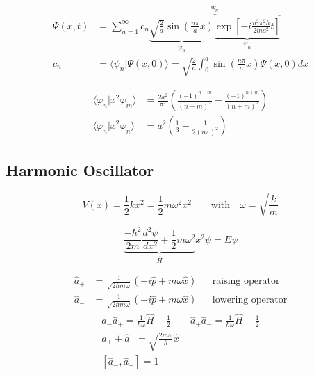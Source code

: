 \noindent\begin{align*}
    \Psi(x,t) & =\sum_{n=1}^{\infty}c_{n} \overbrace{\underbrace{\sqrt{\frac{2}{a}}\sin\left(\frac{n\pi}{a}x\right)}_{\psi_n} \underbrace{\exp\left[-i\frac{n^{2}\pi^{2}\hbar}{2ma^{2}}t\right]}_{\varphi_n}}^{\Psi_n} \\
    c_n       & =\langle \psi_n|\Psi(x,0)\rangle = \sqrt{\frac{2}{a}}\int_0^a\sin\left(\frac{n\pi}{a}x\right)\Psi(x,0)dx
\end{align*}

\noindent\begin{align*}
    \langle \varphi_n|x^2\varphi_m\rangle & = \frac{2a^2}{\pi^2}\left(\frac{{(-1)}^{n-m}}{{(n-m)}^2}-\frac{{(-1)}^{n+m}}{{(n+m)}^2}\right) \\
    \langle \varphi_n|x^2\varphi_n\rangle & = a^2\left(\frac{1}{3} -\frac{1}{2{(n\pi)}^2}\right)
\end{align*}

\subsection{Harmonic Oscillator}
\begin{equation*}
    V(x) = \frac{1}{2}k x^2 = \frac{1}{2}m \omega^2 x^2 \qquad \text{with} \quad \omega = \sqrt{\frac{k}{m}}
\end{equation*}

\noindent\begin{equation*}
    \underbrace{\frac{-\hbar^2}{2m}\frac{d^2\psi}{dx^2} + \frac{1}{2}m \omega^2}_{\widehat{H}} x^2 \psi  = E\psi
\end{equation*}

\begin{align*}
    \widehat{a}_{+} & = \frac{1}{\sqrt{2\hbar m \omega}}\left(-i\widehat{p}+m\omega\widehat{x}\right) &  & \text{raising operator}  \\
    \widehat{a}_{-} & = \frac{1}{\sqrt{2\hbar m \omega}}\left(+i\widehat{p}+m\omega\widehat{x}\right) &  & \text{lowering operator}
\end{align*}
\noindent\begin{gather*}
    \widehat{a}_{-}\widehat{a}_{+}=\frac{1}{\hbar\omega}\widehat{H}+\frac{1}{2} \quad\quad \widehat{a}_{+}\widehat{a}_{-}=\frac{1}{\hbar\omega}\widehat{H}-\frac{1}{2} \\
    \widehat{a}_{+} + \widehat{a}_{-} = \sqrt{\frac{2m\omega}{\hbar}} \widehat{x} \\
    \left[\widehat{a}_{-},\widehat{a}_{+}\right] = 1
\end{gather*}

